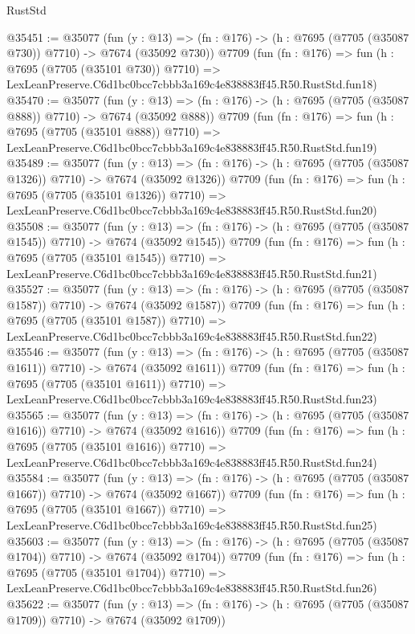 \begin{lexlean}{RustStd}
\begin{coremodule}
@35451 := @35077
    (fun (y : @13) => (fn : @176) -> (h : @7695 (@7705 (@35087 @730)) @7710) -> @7674 (@35092 @730))
    @7709
    (fun (fn : @176) =>
    fun (h : @7695 (@7705 (@35101 @730)) @7710) =>
    LexLeanPreserve.C6d1bc0bcc7cbbb3a169c4e838883ff45.R50.RustStd.fun18)
@35470 := @35077
    (fun (y : @13) => (fn : @176) -> (h : @7695 (@7705 (@35087 @888)) @7710) -> @7674 (@35092 @888))
    @7709
    (fun (fn : @176) =>
    fun (h : @7695 (@7705 (@35101 @888)) @7710) =>
    LexLeanPreserve.C6d1bc0bcc7cbbb3a169c4e838883ff45.R50.RustStd.fun19)
@35489 := @35077
    (fun (y : @13) =>
    (fn : @176) -> (h : @7695 (@7705 (@35087 @1326)) @7710) -> @7674 (@35092 @1326))
    @7709
    (fun (fn : @176) =>
    fun (h : @7695 (@7705 (@35101 @1326)) @7710) =>
    LexLeanPreserve.C6d1bc0bcc7cbbb3a169c4e838883ff45.R50.RustStd.fun20)
@35508 := @35077
    (fun (y : @13) =>
    (fn : @176) -> (h : @7695 (@7705 (@35087 @1545)) @7710) -> @7674 (@35092 @1545))
    @7709
    (fun (fn : @176) =>
    fun (h : @7695 (@7705 (@35101 @1545)) @7710) =>
    LexLeanPreserve.C6d1bc0bcc7cbbb3a169c4e838883ff45.R50.RustStd.fun21)
@35527 := @35077
    (fun (y : @13) =>
    (fn : @176) -> (h : @7695 (@7705 (@35087 @1587)) @7710) -> @7674 (@35092 @1587))
    @7709
    (fun (fn : @176) =>
    fun (h : @7695 (@7705 (@35101 @1587)) @7710) =>
    LexLeanPreserve.C6d1bc0bcc7cbbb3a169c4e838883ff45.R50.RustStd.fun22)
@35546 := @35077
    (fun (y : @13) =>
    (fn : @176) -> (h : @7695 (@7705 (@35087 @1611)) @7710) -> @7674 (@35092 @1611))
    @7709
    (fun (fn : @176) =>
    fun (h : @7695 (@7705 (@35101 @1611)) @7710) =>
    LexLeanPreserve.C6d1bc0bcc7cbbb3a169c4e838883ff45.R50.RustStd.fun23)
@35565 := @35077
    (fun (y : @13) =>
    (fn : @176) -> (h : @7695 (@7705 (@35087 @1616)) @7710) -> @7674 (@35092 @1616))
    @7709
    (fun (fn : @176) =>
    fun (h : @7695 (@7705 (@35101 @1616)) @7710) =>
    LexLeanPreserve.C6d1bc0bcc7cbbb3a169c4e838883ff45.R50.RustStd.fun24)
@35584 := @35077
    (fun (y : @13) =>
    (fn : @176) -> (h : @7695 (@7705 (@35087 @1667)) @7710) -> @7674 (@35092 @1667))
    @7709
    (fun (fn : @176) =>
    fun (h : @7695 (@7705 (@35101 @1667)) @7710) =>
    LexLeanPreserve.C6d1bc0bcc7cbbb3a169c4e838883ff45.R50.RustStd.fun25)
@35603 := @35077
    (fun (y : @13) =>
    (fn : @176) -> (h : @7695 (@7705 (@35087 @1704)) @7710) -> @7674 (@35092 @1704))
    @7709
    (fun (fn : @176) =>
    fun (h : @7695 (@7705 (@35101 @1704)) @7710) =>
    LexLeanPreserve.C6d1bc0bcc7cbbb3a169c4e838883ff45.R50.RustStd.fun26)
@35622 := @35077
    (fun (y : @13) =>
    (fn : @176) -> (h : @7695 (@7705 (@35087 @1709)) @7710) -> @7674 (@35092 @1709))

\end{coremodule}
\end{lexlean}
